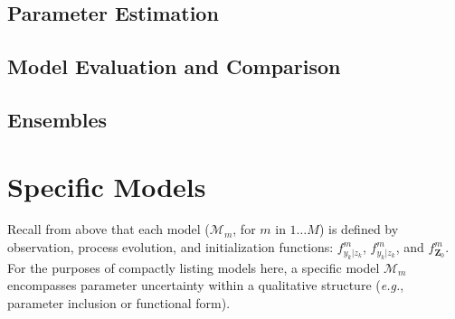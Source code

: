 \documentclass{article}
\begin{document}
\subsection{Parameter Estimation}
\label{subsec:devmods_pe}

\subsection{Model Evaluation and Comparison}
\label{subsec:devmods_mec}

\subsection{Ensembles}
\label{subsec:devmods_ens}

\section{Specific Models}
\label{sec:mods}

Recall from above that each model ($\mathcal{M}_m$, for $m$ in $1 \ldots M$) is defined by observation, process evolution, and initialization functions: $f^m_{y_k|z_k}$, $f^m_{y_k|z_k}$, and $f^m_{\textbf{Z}_0}$. For the purposes of compactly listing models here, a specific model $\mathcal{M}_m$ encompasses parameter uncertainty within a qualitative structure (\emph{e.g.}, parameter inclusion or functional form). 

  
\end{document}
